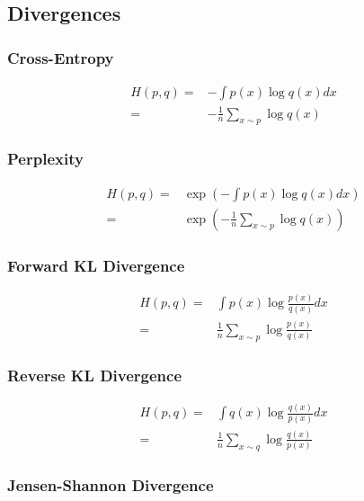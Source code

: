 \subsection{Divergences}

\subsubsection{Cross-Entropy}
\begin{equation}
  \begin{aligned}
    H(p, q) =& - \int p(x) \log q(x) dx \\
    =& - \frac{1}{n} \sum_{x \sim p} \log q(x)
  \end{aligned}
\end{equation}
\subsubsection{Perplexity}
\begin{equation}
  \begin{aligned}
    H(p, q) =& \exp \left( - \int p(x) \log q(x) dx \right) \\
    =& \exp \left(- \frac{1}{n} \sum_{x \sim p} \log q(x) \right)
  \end{aligned}
\end{equation}
\subsubsection{Forward KL Divergence}
\begin{equation}
  \begin{aligned}
    H(p, q) =& \int p(x) \log \frac{p(x)}{q(x)} dx  \\
    =&  \frac{1}{n} \sum_{x \sim p} \log \frac{p(x)}{q(x)}
  \end{aligned}
\end{equation}
\subsubsection{Reverse KL Divergence}
\begin{equation}
  \begin{aligned}
    H(p, q) =& \int q(x) \log \frac{q(x)}{p(x)} dx  \\
    =&  \frac{1}{n} \sum_{x \sim q} \log \frac{q(x)}{p(x)}
  \end{aligned}
\end{equation}
\subsubsection{Jensen-Shannon Divergence}
